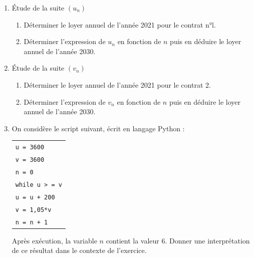 \documentclass[10pt]{article}
\providecommand{\np}[2][]{{#2~#1}}
\providecommand{\no}{{\text{n°}}}
\begin{document}
\begin{enumerate}
\item Étude de la suite $\left(u_n\right)$
	\begin{enumerate}
		\item Déterminer le loyer annuel de l'année 2021 pour le contrat n°l.
		\item Déterminer l'expression de $u_n$ en fonction de $n$ puis en déduire le loyer annuel de
l'année 2030.
	\end{enumerate}
\item Étude de la suite $\left(v_n\right)$
	\begin{enumerate}
		\item Déterminer le loyer annuel de l'année 2021 pour le contrat \no 2.
		\item Déterminer l'expression de $v_n$ en fonction de $n$ puis en déduire le loyer annuel de l'année 2030.
	\end{enumerate}
\item On considère le script suivant, écrit en langage Python :

\begin{center}
\begin{tabular}{|l|}\hline
\texttt{u = \np{3600}}\\
\texttt{v = \np{3600}}\\
\texttt{n = 0}\\
\texttt{while u > = v}\\
\qquad \texttt{u = u + 200}\\
\qquad \texttt{v = 1,05*v}\\
\qquad \texttt{n = n + 1}\\ \hline
\end{tabular}
\end{center}

Après exécution, la variable $n$ contient la valeur 6. Donner une interprétation de ce résultat dans le contexte de l'exercice.
\end{enumerate}

\bigskip
\end{document}
